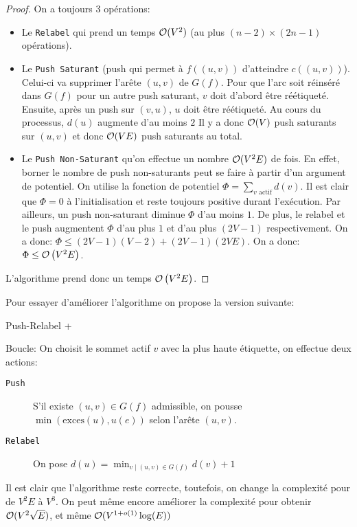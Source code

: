 \documentclass[math, info]{cours}
\begin{document}
\begin{proof}
	On a toujours $3$ opérations:
	\begin{itemize}
		\item Le \texttt{Relabel} qui prend un temps $\mathcal{O}(V^{2})$ (au plus $(n-2) \times (2n-1)$ opérations).
		\item Le \texttt{Push Saturant} (push qui permet à $f((u, v))$ d'atteindre $c((u, v))$). Celui-ci va supprimer l'arête $(u, v)$ de $G(f)$.
		      Pour que l'arc soit réinséré dans $G(f)$ pour un autre push saturant,
		      $v$ doit d'abord être réétiqueté.
		      Ensuite, après un push sur $(v, u)$, $u$ doit être réétiqueté.
		      Au cours du processus, $d(u)$ augmente d'au moins $2$
		      Il y a donc $\mathcal{O}(V)$ push saturants sur $(u, v)$ et donc $\mathcal{O}(VE)$ push saturants au total.
		\item Le \texttt{Push Non-Saturant} qu'on effectue un nombre $\mathcal{O}(V^{2}E)$ de fois.
		      En effet, borner le nombre de push non-saturants peut se faire à partir d'un argument de potentiel.
		      On utilise la fonction de potentiel $\Phi =\sum_{v \text{ actif}} d(v)$.
		      Il est clair que $\Phi = 0$ à l'initialisation et reste toujours positive durant l'exécution.
		      Par ailleurs, un push non-saturant diminue $\Phi$ d'au moins $1$.
		      De plus, le relabel et le push augmentent $\Phi$ d'au plus $1$ et d'au plus $(2V - 1)$ respectivement.
		      On a donc: $\Phi \leq \left(2V-1\right)\left(V - 2\right) + \left(2V - 1\right)\left(2VE\right)$.
		      On a donc: $\Phi \leq \mathcal{O}\left(V^{2}E\right)$.
	\end{itemize}
	L'algorithme prend donc un temps $\mathcal{O}\left(V^{2}E\right)$.
\end{proof}

Pour essayer d'améliorer l'algorithme on propose la version suivante:
\begin{algorithm}
	\caption{Push-Relabel +}
	\label{alg:pushrelabel+}
	Boucle: On choisit le sommet actif $v$ avec la plus haute étiquette, on effectue deux actions:
	\begin{description}
		\item[\tt Push] S'il existe $(u,v) \in G(f)$ admissible, on pousse $\min \left(\mathrm{exces}(u), u(e)\right)$ selon l'arête $(u, v)$.
		\item[\tt Relabel] On pose $d(u) = \min_{v\mid (u, v) \in G(f)}d(v) + 1$
	\end{description}
\end{algorithm}
Il est clair que l'algorithme reste correcte, toutefois, on change la complexité pour de $V^{2}E$ à $V^{3}$.
On peut même encore améliorer la complexité pour obtenir $\mathcal{O}(V^{2}\sqrt{E})$, et même $\mathcal{O}(V^{1 + o(1)}\log(E))$
\end{document}
